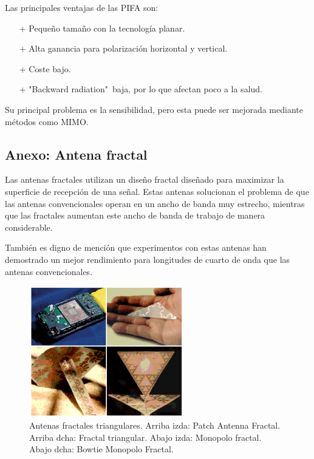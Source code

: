 \documentclass[a4paper,11pt,titlepage]{article}
\begin{document}
Las principales ventajas de las PIFA son:
\begin{itemize}
\item[+] Pequeño tamaño con la tecnología planar.
\item[+] Alta ganancia para polarización horizontal y vertical.
\item[+] Coste bajo.
\item[+] "Backward radiation"\ baja, por lo que afectan poco a la salud.
\end{itemize}
Su principal problema es la sensibilidad, pero esta puede ser mejorada mediante métodos como MIMO.
\subsection{Anexo: Antena fractal}
Las antenas fractales utilizan un diseño fractal diseñado para maximizar la superficie de recepción de una señal. Estas antenas solucionan el problema de que las antenas convencionales operan en un ancho de banda muy estrecho, mientras que las fractales aumentan este ancho de banda de trabajo de manera considerable.\par
También es digno de mención que experimentos con estas antenas han demostrado un mejor rendimiento para longitudes de cuarto de onda que las antenas convencionales.
\begin{figure}[H]
\centering
\includegraphics[width=0.6\textwidth]{fractal}
\caption{Antenas fractales triangulares. Arriba izda: Patch Antenna Fractal. Arriba dcha: Fractal triangular. Abajo izda: Monopolo fractal. Abajo dcha: Bowtie Monopolo Fractal. }
\end{figure}
\end{document}
